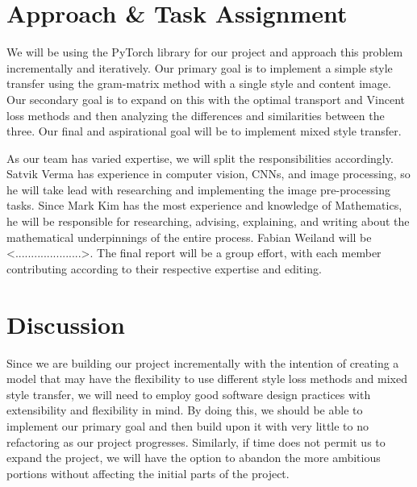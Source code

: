 \documentclass[12pt]{article}
\begin{document}
\section{Approach \& Task Assignment}
We will be using the PyTorch library for our project and approach this problem
incrementally and iteratively. Our primary goal is to implement a simple style
transfer using the gram-matrix method with a single style and content image.
Our secondary goal is to expand on this with the optimal transport and Vincent
loss methods and then analyzing the differences and similarities between the
three.  Our final and aspirational goal will be to implement mixed style
transfer.

As our team has varied expertise, we will split the responsibilities
accordingly.  Satvik Verma has experience in computer vision, CNNs, and image
processing, so he will take lead with researching and implementing the image
pre-processing tasks.  Since Mark Kim has the most experience and knowledge of
Mathematics, he will be responsible for researching, advising, explaining, and
writing about the mathematical underpinnings of the entire process.  Fabian
Weiland will be \textless.....................\textgreater.  The final report will be a group
effort, with each member contributing according to their respective expertise
and editing. 

\section{Discussion}
Since we are building our project incrementally with the intention of creating a
model that may have the flexibility to use different style loss methods and
mixed style transfer, we will need to employ good software design practices with
extensibility and flexibility in mind.  By doing this, we should be able to
implement our primary goal and then build upon it with very little to no
refactoring as our project progresses.  Similarly, if time does not permit us to
expand the project, we will have the option to abandon the more ambitious
portions without affecting the initial parts of the project.
\end{document}
